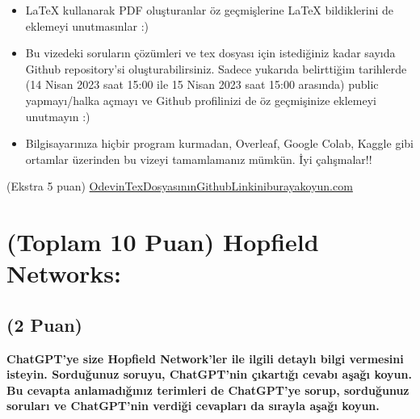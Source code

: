 \documentclass[11pt]{article}
\begin{document}
\begin{itemize}
    \item LaTeX kullanarak PDF oluşturanlar öz geçmişlerine LaTeX bildiklerini de eklemeyi unutmasınlar :)
    \item Bu vizedeki soruların çözümleri ve tex dosyası için istediğiniz kadar sayıda Github repository'si oluşturabilirsiniz. Sadece yukarıda belirttiğim tarihlerde (14 Nisan 2023 saat 15:00 ile 15 Nisan 2023 saat 15:00 arasında) public yapmayı/halka açmayı ve Github profilinizi de öz geçmişinize eklemeyi unutmayın :)
    \item Bilgisayarınıza hiçbir program kurmadan, Overleaf, Google Colab, Kaggle gibi ortamlar üzerinden bu vizeyi tamamlamanız mümkün. İyi çalışmalar!!
\end{itemize}

(Ekstra 5 puan) \url{OdevinTexDosyasınınGithubLinkiniburayakoyun.com}

\newpage
\section{(Toplam 10 Puan) Hopfield Networks:}

\subsection{(2 Puan)} \textbf{ChatGPT’ye size Hopfield Network’ler ile ilgili detaylı bilgi vermesini isteyin. Sorduğunuz soruyu, ChatGPT'nin çıkartığı cevabı aşağı koyun. Bu cevapta anlamadığınız terimleri de ChatGPT’ye sorup, sorduğunuz soruları ve ChatGPT’nin verdiği cevapları da sırayla aşağı koyun.}
\end{document}
